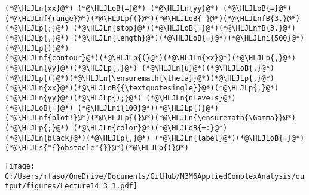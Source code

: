 \documentclass[12pt,a4paper]{article}
\newcommand{\HLJLn}[1]{#1}
\newcommand{\HLJLnf}[1]{\textcolor[RGB]{66,102,213}{#1}}
\newcommand{\HLJLs}[1]{\textcolor[RGB]{201,61,57}{#1}}
\newcommand{\HLJLnfB}[1]{\textcolor[RGB]{59,151,46}{#1}}
\newcommand{\HLJLni}[1]{\textcolor[RGB]{59,151,46}{#1}}
\newcommand{\HLJLoB}[1]{\textcolor[RGB]{102,102,102}{\textbf{#1}}}
\newcommand{\HLJLp}[1]{#1}
\begin{document}
\begin{lstlisting}
(*@\HLJLn{xx}@*) (*@\HLJLoB{=}@*) (*@\HLJLn{yy}@*) (*@\HLJLoB{=}@*) (*@\HLJLnf{range}@*)(*@\HLJLp{(}@*)(*@\HLJLoB{-}@*)(*@\HLJLnfB{3.}@*)(*@\HLJLp{;}@*) (*@\HLJLn{stop}@*)(*@\HLJLoB{=}@*)(*@\HLJLnfB{3.}@*)(*@\HLJLp{,}@*) (*@\HLJLn{length}@*)(*@\HLJLoB{=}@*)(*@\HLJLni{500}@*)(*@\HLJLp{)}@*)
(*@\HLJLnf{contour}@*)(*@\HLJLp{(}@*)(*@\HLJLn{xx}@*)(*@\HLJLp{,}@*) (*@\HLJLn{yy}@*)(*@\HLJLp{,}@*) (*@\HLJLn{u}@*)(*@\HLJLoB{.}@*)(*@\HLJLp{(}@*)(*@\HLJLn{\ensuremath{\theta}}@*)(*@\HLJLp{,}@*) (*@\HLJLn{xx}@*)(*@\HLJLoB{{\textquotesingle}}@*)(*@\HLJLp{,}@*)(*@\HLJLn{yy}@*)(*@\HLJLp{);}@*) (*@\HLJLn{nlevels}@*) (*@\HLJLoB{=}@*) (*@\HLJLni{100}@*)(*@\HLJLp{)}@*)
(*@\HLJLnf{plot!}@*)(*@\HLJLp{(}@*)(*@\HLJLn{\ensuremath{\Gamma}}@*)(*@\HLJLp{;}@*) (*@\HLJLn{color}@*)(*@\HLJLoB{=:}@*)(*@\HLJLn{black}@*)(*@\HLJLp{,}@*) (*@\HLJLn{label}@*)(*@\HLJLoB{=}@*)(*@\HLJLs{"{}obstacle"{}}@*)(*@\HLJLp{)}@*)
\end{lstlisting}

\texttt{[image: C:/Users/mfaso/OneDrive/Documents/GitHub/M3M6AppliedComplexAnalysis/output/figures/Lecture14\_3\_1.pdf]}
\end{document}
